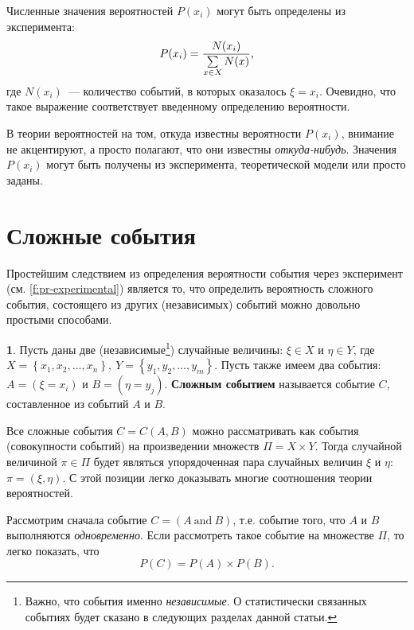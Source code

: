 \documentclass[12pt,a4paper,openright]{book}
\theoremstyle{definition}
\newtheorem{definition}{\textls[150]{Определение}}[chapter]
\numberwithin{equation}{chapter}
\begin{document}
\begin{appendices}
		Численные значения вероятностей $P(x_i)$ могут быть определены из эксперимента:
		\begin{equation}\label{f:pr-experimental}
			P(x_i) = {N(x_i) \over \sum\limits_{x \in X} N(x)} \text{,}
		\end{equation}
		где $N(x_i)$~--- количество событий, в которых оказалось $\xi = x_i$. Очевидно, что такое выражение соответствует введенному определению вероятности.

		В теории вероятностей на том, откуда известны вероятности $P(x_i)$, внимание не акцентируют, а просто полагают, что они известны \textit{откуда-нибудь}. Значения $P(x_i)$ могут быть получены из эксперимента, теоретической модели или просто заданы.

		\section{Сложные события}

		Простейшим следствием из определения вероятности события через эксперимент (см. \autoref{f:pr-experimental}) является то, что определить вероятность сложного события, состоящего из других (независимых) событий можно довольно простыми способами.

		\begin{definition}
			Пусть даны две (независимые\footnote{Важно, что события именно \textit{независимые}. О статистически связанных событиях будет сказано в следующих разделах данной статьи.}) случайные величины: $\xi \in X$ и $\eta \in Y$, где $X=\left\{x_1, x_2, \dots, x_n \right\}, \ Y=\left\{y_1, y_2, \dots, y_m \right\}$. Пусть также имеем два события: $A=(\xi = x_i)$ и $B=(\eta = y_j)$. \textbf{Сложным событием} называется событие $C$, составленное из событий $A$ и $B$.
		\end{definition}

		Все сложные события $C = C(A,B)$ можно рассматривать как события (совокупности событий) на произведении множеств $\varPi = X \times Y$. Тогда случайной величиной $\pi \in \varPi$ будет являться упорядоченная пара случайных величин $\xi$ и $\eta$: $\pi = (\xi, \eta)$. С этой позиции легко доказывать многие соотношения теории вероятностей.

		Рассмотрим сначала событие $C = (A \ \mathrm{and} \ B)$, т.е. событие того, что $A$ и $B$ выполняются \textit{одновременно}. Если рассмотреть такое событие на множестве $\varPi$, то легко показать, что
		\begin{equation}
			P(C) = P(A) \times P(B) \text{.}
		\end{equation}


\end{appendices}
\end{document}
